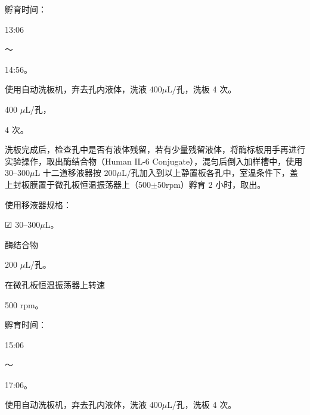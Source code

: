 \documentclass[UTF8,10pt,a4paper,fontset=fandol]{ctexart}
\newcommand{\fieldvalue}[1]{#1}
\newcommand{\handwritten}[1]{#1}
\newcommand{\checkboxfield}[1]{\ifstrequal{#1}{checked}{☑}{\ifstrequal{#1}{unclear}{?}{☐}}}
\begin{document}
孵育时间：

\fieldvalue{\handwritten{13:06}}

～

\fieldvalue{\handwritten{14:56}}。

\vspace{1mm}

\noindent
使用自动洗板机，弃去孔内液体，洗液 400$\mu$L/孔，洗板 4 次。

\fieldvalue{\handwritten{400}} $\mu$L/孔，

\fieldvalue{\handwritten{4}} 次。

\vspace{2mm}

\noindent
洗板完成后，检查孔中是否有液体残留，若有少量残留液体，将酶标板用手再进行实验操作，取出酶结合物（Human IL-6 Conjugate），混匀后倒入加样槽中，使用 30--300$\mu$L 十二道移液器按 200$\mu$L/孔加入到以上静置板各孔中，室温条件下，盖上封板膜置于微孔板恒温振荡器上（500$\pm$50rpm）孵育 2 小时，取出。

\noindent
使用移液器规格：

\fieldvalue{\checkboxfield{checked}} 30--300$\mu$L。

\vspace{1mm}

\noindent
酶结合物

\fieldvalue{\handwritten{200}} $\mu$L/孔。

在微孔板恒温振荡器上转速

\fieldvalue{\handwritten{500}} rpm。

孵育时间：

\fieldvalue{\handwritten{15:06}}

～

\fieldvalue{\handwritten{17:06}}。

\vspace{1mm}

\noindent
使用自动洗板机，弃去孔内液体，洗液 400$\mu$L/孔，洗板 4 次。
\end{document}
